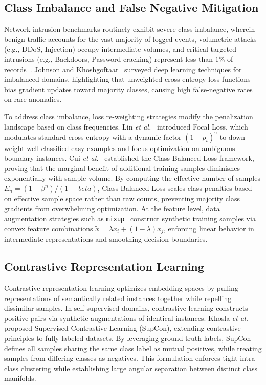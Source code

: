 \documentclass[journal,onecolumn]{IEEEtran}
\begin{document}
\subsection{Class Imbalance and False Negative Mitigation}
Network intrusion benchmarks routinely exhibit severe class imbalance, wherein benign traffic accounts for the vast majority of logged events, volumetric attacks (e.g., DDoS, Injection) occupy intermediate volumes, and critical targeted intrusions (e.g., Backdoors, Password cracking) represent less than $1\%$ of records~\cite{alsaedi2020toniot}. Johnson and Khoshgoftaar~\cite{johnson2019survey} surveyed deep learning techniques for imbalanced domains, highlighting that unweighted cross-entropy loss functions bias gradient updates toward majority classes, causing high false-negative rates on rare anomalies.

To address class imbalance, loss re-weighting strategies modify the penalization landscape based on class frequencies. Lin \emph{et al.}~\cite{lin2017focal} introduced Focal Loss, which modulates standard cross-entropy with a dynamic factor $(1 - p_t)^\gamma$ to down-weight well-classified easy examples and focus optimization on ambiguous boundary instances. Cui \emph{et al.}~\cite{cui2019cbloss} established the Class-Balanced Loss framework, proving that the marginal benefit of additional training samples diminishes exponentially with sample volume. By computing the effective number of samples $E_n = (1 - \beta^n)/(1 - \ beta)$, Class-Balanced Loss scales class penalties based on effective sample space rather than raw counts, preventing majority class gradients from overwhelming optimization. At the feature level, data augmentation strategies such as \texttt{mixup}~\cite{zhang2018mixup} construct synthetic training samples via convex feature combinations $\tilde{x} = \lambda x_i + (1 - \lambda) x_j$, enforcing linear behavior in intermediate representations and smoothing decision boundaries.

\subsection{Contrastive Representation Learning}
Contrastive representation learning optimizes embedding spaces by pulling representations of semantically related instances together while repelling dissimilar samples. In self-supervised domains, contrastive learning constructs positive pairs via synthetic augmentations of identical instances. Khosla \emph{et al.}~\cite{khosla2020supcon} proposed Supervised Contrastive Learning (SupCon), extending contrastive principles to fully labeled datasets. By leveraging ground-truth labels, SupCon defines all samples sharing the same class label as mutual positives, while treating samples from differing classes as negatives. This formulation enforces tight intra-class clustering while establishing large angular separation between distinct class manifolds. 
\end{document}
